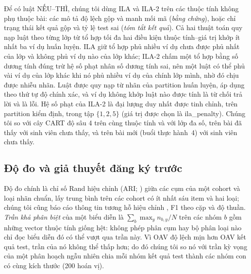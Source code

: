 Để có luật NẾU--THÌ, chúng tôi dùng ILA \citep{tolun1998ila} và ILA-2 \citep{tolun1999ila2} trên các thuộc tính không phụ thuộc bài: các mô tả độ lệch gộp và manh mối mã (\emph{bằng chứng}), hoặc chỉ trạng thái kết quả gộp và tỷ lệ test sai (\emph{tóm tắt kết quả}). Cả hai thuật toán quy nạp luật theo từng lớp từ tổ hợp tối đa hai điều kiện thuộc tính--giá trị khớp ít nhất ba ví dụ huấn luyện. ILA giữ tổ hợp phủ nhiều ví dụ chưa được phủ nhất của lớp và không phủ ví dụ nào của lớp khác; ILA-2 chấm một tổ hợp bằng số dương tính đúng trừ hệ số phạt nhân số dương tính sai, nên một luật có thể phủ vài ví dụ của lớp khác khi nó phủ nhiều ví dụ của chính lớp mình, nhờ đó chịu được nhiễu nhãn. Luật được quy nạp từ nhãn của partition huấn luyện, áp dụng theo thứ tự độ chính xác, và ví dụ không khớp luật nào được tính là từ chối trả lời và là lỗi. Hệ số phạt của ILA-2 là đại lượng duy nhất được tinh chỉnh, trên partition kiểm định, trong tập $\{1,2,5\}$ (giá trị được chọn là {{ila_penalty}}). Chúng tôi so với cây CART độ sâu 4 trên cùng thuộc tính và với lớp đa số, trên bài đã thấy với sinh viên chưa thấy, và trên bài mới (buổi thực hành~4) với sinh viên chưa thấy.

\subsection{Độ đo và giả thuyết đăng ký trước}\label{sec:hyp}
Độ đo chính là chỉ số Rand hiệu chỉnh (ARI; \citealt{hubert1985ari}) giữa các cụm của một cohort và loại nhãn chuẩn, lấy trung bình trên các cohort có ít nhất sáu item và hai loại; chúng tôi cũng báo cáo thông tin tương hỗ hiệu chỉnh \citep{vinh2010ami}, F1 theo cặp và độ thuần. \emph{Trần khả phân biệt} của một biểu diễn là $\sum_b \max_y n_{b,y}/N$ trên các nhóm $b$ gồm những vector thuộc tính giống hệt: không phép phân cụm hay bộ phân loại nào chỉ đọc biểu diễn đó có thể vượt qua trần này. Vì OAV độ lệch mịn hơn OAV kết quả test, trần của nó không thể thấp hơn; do đó chúng tôi so nó với trần kỳ vọng của một phân hoạch ngẫu nhiên chia mỗi nhóm kết quả test thành các nhóm con có cùng kích thước (200 hoán vị).

